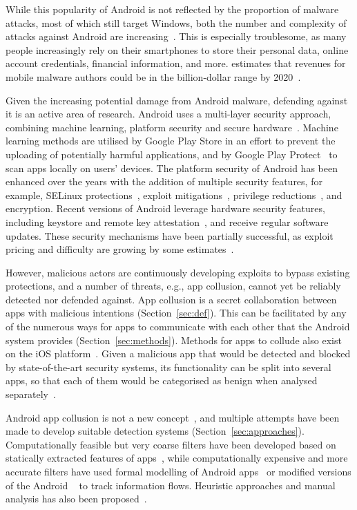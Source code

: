 \documentclass[article]{aaltoseries}
\newcommand{\Sref}[1]{Section~\ref{#1}}
\renewcommand\gls\cgls
\begin{document}
While this popularity of Android is not reflected by the proportion of malware attacks, most of which still target Windows, both the number and complexity of attacks against Android are increasing~\cite{AVTESTGH2018}. This is especially troublesome, as many people increasingly rely on their smartphones to store their personal data, online account credentials, financial information, and more. \citeauthor{McAfee2018} estimates that revenues for mobile malware authors could be in the billion-dollar range by 2020~\cite{McAfee2018}.

Given the increasing potential damage from Android malware, defending against it is an active area of research. Android uses a multi-layer security approach, combining machine learning, platform security and secure hardware~\cite{AOSP2018}. Machine learning methods are utilised by Google Play Store in an effort to prevent the uploading of potentially harmful applications, and by Google Play Protect~\cite{AOSPplayprotect} to scan apps locally on users' devices. The platform security of Android has been enhanced over the years with the addition of multiple security features, for example, SELinux protections~\cite[\href{https://source.android.com/security/selinux}{``Security-Enhanced Linux in Android''}]{AOSPsecurity}, exploit mitigations~\cite{Edge2016}, privilege reductions~\cite{Lawrence2017}, and encryption. Recent versions of Android leverage hardware security features, including keystore and remote key attestation~\cite{Willden2017}, and receive regular software updates. These security mechanisms have been partially successful, as exploit pricing and difficulty are growing by some estimates~\cite{AOSP2018}.

However, malicious actors are continuously developing exploits to bypass existing protections, and a number of threats, e.g., app collusion, cannot yet be reliably detected nor defended against. App collusion is a secret collaboration between apps with malicious intentions (\Sref{sec:def}). This can be facilitated by any of the numerous ways for apps to communicate with each other that the Android system provides (\Sref{sec:methods}). Methods for apps to collude also exist on the iOS platform~\cite{Deshotels2016}. Given a malicious app that would be detected and blocked by state-of-the-art security systems, its functionality can be split into several apps, so that each of them would be categorised as benign when analysed separately~\cite{Chen2018}.

Android app collusion is not a new concept~\cite{Schlegel2011}, and multiple attempts have been made to develop suitable detection systems (\Sref{sec:approaches}). Computationally feasible but very coarse filters have been developed based on statically extracted features of apps~\cite{Asavoae2016, Chen2018}, while computationally expensive and more accurate filters have used formal modelling of Android apps~\cite{Asavoae2018} or modified versions of the Android \gls{os}~\cite{Enck2014} to track information flows. Heuristic approaches and manual analysis has also been proposed~\cite{Muttik2016}.
\end{document}
